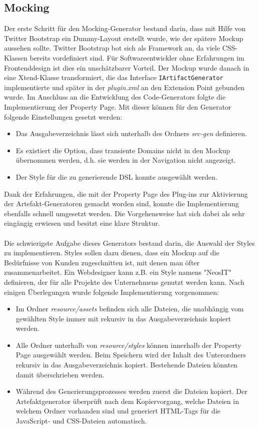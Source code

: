 \documentclass[a4paper,12pt]{scrreprt}
\begin{document}
\subsection{Mocking}
Der erste Schritt für den Mocking-Generator bestand darin, dass mit Hilfe von Twitter Bootstrap ein Dummy-Layout erstellt wurde, wie der spätere Mockup aussehen sollte. Twitter Bootstrap bot sich als Framework an, da viele CSS-Klassen bereits vordefiniert sind. Für Softwareentwickler ohne Erfahrungen im Frontenddesign ist dies ein unschätzbarer Vorteil.
Der Mockup wurde danach in eine Xtend-Klasse transformiert, die das Interface \verb+IArtifactGenerator+ implementierte und später in der \emph{plugin.xml} an den Extension Point gebunden wurde.
Im Anschluss an die Entwicklung des Code-Generators folgte die Implementierung der Property Page. Mit dieser können für den Generator folgende Einstellungen gesetzt werden:
\begin{itemize}
	\item Das Ausgabeverzeichnis lässt sich unterhalb des Ordners \emph{src-gen} definieren.
	\item Es existiert die Option, dass transiente Domains nicht in den Mockup übernommen werden, d.h. sie werden in der Navigation nicht angezeigt.
	\item Der Style für die zu generierende DSL konnte ausgewählt werden.
\end{itemize}
Dank der Erfahrungen, die mit der Property Page des Plug-ins zur Aktivierung der Artefakt-Generatoren gemacht worden sind, konnte die Implementierung ebenfalls schnell umgesetzt werden. Die Vorgehensweise hat sich dabei als sehr eingängig erwiesen und besitzt eine klare Struktur.
\\
\\
Die schwierigste Aufgabe dieses Generators bestand darin, die Auswahl der Styles zu implementieren.
Styles sollen dazu dienen, dass ein Mockup auf die Bedürfnisse von Kunden zugeschnitten ist, mit denen man öfter zusammenarbeitet. Ein Webdesigner kann z.B. ein Style namens "NeosIT" definieren, der für alle Projekte des Unternehmens genutzt werden kann.
Nach einigen Überlegungen wurde folgende Implementierung vorgenommen:
\begin{itemize}
	\item Im Ordner \emph{resource/assets} befinden sich alle Dateien, die unabhängig vom gewählten Style immer mit rekursiv in das Ausgabeverzeichnis kopiert werden.
	\item Alle Ordner unterhalb von \emph{resource/styles} können innerhalb der Property Page ausgewählt werden. Beim Speichern wird der Inhalt des Unterordners rekursiv in das Ausgabeverzeichnis kopiert. Bestehende Dateien könnten damit überschrieben werden.
	\item Während des Generierungsprozesses werden zuerst die Dateien kopiert. Der Artefaktgenerator überprüft nach dem Kopiervorgang, welche Dateien in welchem Ordner vorhanden sind und generiert HTML-Tags für die JavaScript- und CSS-Dateien automatisch.
\end{itemize}
\end{document}
